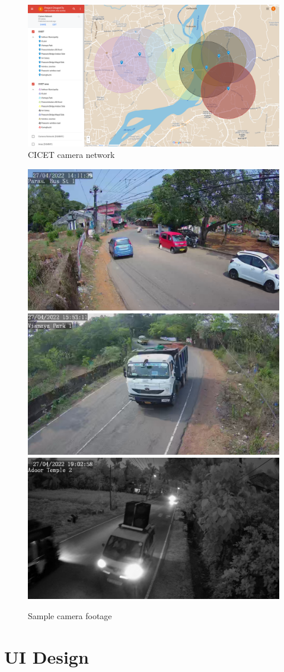 \begin{figure}[!ht]
	\centering
	\includegraphics[width=\linewidth]{Images/camera-network}
	\caption{CICET camera network}
	\label{fig:camera-network}
\end{figure}

\begin{figure}[!ht]
	\centering
	\includegraphics[width=0.32\linewidth]{Images/camera_footage/footage1} \hfill
	\includegraphics[width=0.32\linewidth]{Images/camera_footage/footage2} \hfill
	\includegraphics[width=0.32\linewidth]{Images/camera_footage/night1} \hfill
	\caption{Sample camera footage}
\end{figure}


\section{UI Design}
\lipsum[1]

